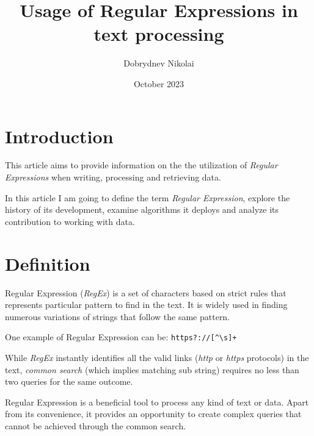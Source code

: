 \documentclass{article}
\title{Usage of Regular Expressions in text processing}
\author{Dobrydnev Nikolai}
\date{October 2023}
\begin{document}
\maketitle

\section{Introduction}
\indent This article aims to provide information on the the utilization of \textit{Regular Expressions} when writing, processing and retrieving data. \par
In this article I am going to define the term \textit{Regular Expression}, explore the history of its development, examine algorithms it deploys and analyze its contribution to working with data. 

\section{Definition}
\indent Regular Expression (\textit{RegEx}) is a set of characters based on strict rules that represents particular pattern to find in the text. It is widely used in finding numerous variations of strings that follow the same pattern. \par

One example of Regular Expression can be: \verb|https?://[^\s]+| \par
While \textit{RegEx} instantly identifies all the valid links  (\textit{http} or \textit{https} protocols) in the text, \textit{common search} (which implies matching sub string) requires no less than two queries for the same outcome. \par

Regular Expression is a beneficial tool to process any kind of text or data. Apart from its convenience, it provides an opportunity to create complex queries that cannot be achieved through the common search.
\end{document}
